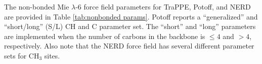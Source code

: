 \documentclass[journal=jced,manuscript=article]{achemso}
\begin{document}
    The non-bonded Mie $\lambda$-6 force field parameters for TraPPE, Potoff, and NERD are provided in Table \ref{tab:nonbonded params}. Potoff reports a ``generalized'' and ``short/long'' (S/L) CH and C parameter set. The ``short'' and ``long'' parameters are implemented when the number of carbons in the backbone is $\le 4$ and $> 4$, respectively. Also note that the NERD force field has several different parameter sets for CH$_3$ sites.
    
\end{document}
